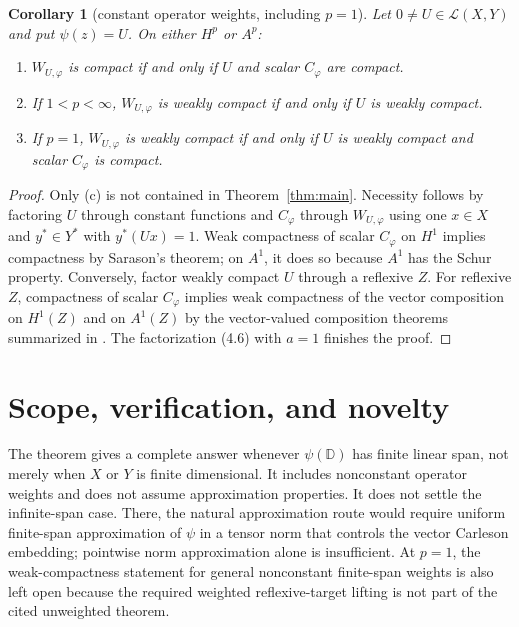 \documentclass[11pt]{article}
\newtheorem{corollary}[theorem]{Corollary}
\theoremstyle{remark}
\newcommand{\D}{\mathbb D}
\newcommand{\cL}{\mathcal L}
\begin{document}
\begin{corollary}[constant operator weights, including $p=1$]\label{cor:constant}
Let $0\ne U\in\cL(X,Y)$ and put $\psi(z)=U$.  On either $H^p$ or $A^p$:
\begin{enumerate}[label=\textup{(\alph*)}]
\item $W_{U,\varphi}$ is compact if and only if $U$ and scalar $C_\varphi$
are compact.
\item If $1<p<\infty$, $W_{U,\varphi}$ is weakly compact if and only if $U$
is weakly compact.
\item If $p=1$, $W_{U,\varphi}$ is weakly compact if and only if $U$ is
weakly compact and scalar $C_\varphi$ is compact.
\end{enumerate}
\end{corollary}

\begin{proof}
Only (c) is not contained in Theorem~\ref{thm:main}.  Necessity follows by
factoring $U$ through constant functions and $C_\varphi$ through
$W_{U,\varphi}$ using one $x\in X$ and $y^*\in Y^*$ with $y^*(Ux)=1$.
Weak compactness of scalar $C_\varphi$ on $H^1$ implies compactness by
Sarason's theorem; on $A^1$, it does so because $A^1$ has the Schur property.
Conversely, factor weakly compact $U$ through a reflexive $Z$.  For reflexive
$Z$, compactness of scalar $C_\varphi$ implies weak compactness of the vector
composition on $H^1(Z)$ and on $A^1(Z)$ by the vector-valued composition
theorems summarized in \cite[Section 3]{LTsurvey}.  The factorization (4.6)
with $a=1$ finishes the proof.
\end{proof}

\section{Scope, verification, and novelty}

The theorem gives a complete answer whenever $\psi(\D)$ has finite linear
span, not merely when $X$ or $Y$ is finite dimensional.  It includes
nonconstant operator weights and does not assume approximation properties.
It does not settle the infinite-span case.  There, the natural approximation
route would require uniform finite-span approximation of $\psi$ in a tensor
norm that controls the vector Carleson embedding; pointwise norm approximation
alone is insufficient.  At $p=1$, the weak-compactness statement for general
nonconstant finite-span weights is also left open because the required
weighted reflexive-target lifting is not part of the cited unweighted theorem.
\end{document}
